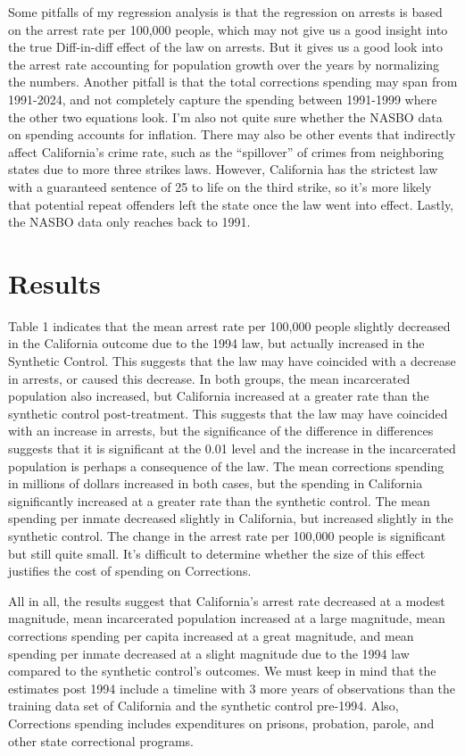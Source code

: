 \documentclass[12pt]{article}
\begin{document}
     Some pitfalls of my regression analysis is that the regression on arrests is based on the arrest rate per 100,000 people, which may not give us a good insight into the true Diff-in-diff effect of the law on arrests. But it gives us a good look into the arrest rate accounting for population growth over the years by normalizing the numbers. Another pitfall is that the total corrections spending may span from 1991-2024, and not completely capture the spending between 1991-1999 where the other two equations look. I’m also not quite sure whether the NASBO data on spending accounts for inflation. There may also be other events that indirectly affect California’s crime rate, such as the “spillover” of crimes from neighboring states due to more three strikes laws. However, California has the strictest law with a guaranteed sentence of 25 to life on the third strike, so it’s more likely that potential repeat offenders left the state once the law went into effect. Lastly, the NASBO data only reaches back to 1991.
     
\section{Results}
    Table 1 indicates that the mean arrest rate per 100,000 people slightly decreased in the California outcome due to the 1994 law, but actually increased in the Synthetic Control. This suggests that the law may have coincided with a decrease in arrests, or caused this decrease. In both groups, the mean incarcerated population also increased, but California increased at a greater rate than the synthetic control post-treatment. This suggests that the law may have coincided with an increase in arrests, but the significance of the difference in differences suggests that it is significant at the 0.01 level and the increase in the incarcerated population is perhaps a consequence of the law. The mean corrections spending in millions of dollars increased in both cases, but the spending in California significantly increased at a greater rate than the synthetic control. The mean spending per inmate decreased slightly in California, but increased slightly in the synthetic control. The change in the arrest rate per 100,000 people is significant but still quite small. It's difficult to determine whether the size of this effect justifies the cost of spending on Corrections. 
    
    All in all, the results suggest that California's arrest rate decreased at a modest magnitude, mean incarcerated population increased at a large magnitude, mean corrections spending per capita increased at a great magnitude, and mean spending per inmate decreased at a slight magnitude due to the 1994 law compared to the synthetic control's outcomes. We must keep in mind that the estimates post 1994 include a timeline with 3 more years of observations than the training data set of California and the synthetic control pre-1994. Also, Corrections spending includes expenditures on prisons, probation, parole, and other state correctional programs. 
\end{document}
